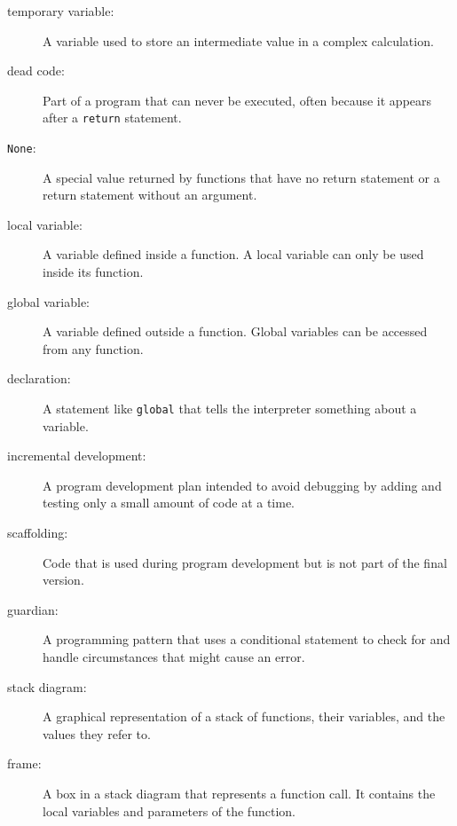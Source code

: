 \begin{description}

\item[temporary variable:]  A variable used to store an intermediate value in
a complex calculation.

\item[dead code:]  Part of a program that can never be executed, often because
it appears after a {\tt return} statement.

\item[{\tt None}:]  A special value returned by functions that
have no return statement or a return statement without an argument.

\item[local variable:]  A variable defined inside a function.  A local
variable can only be used inside its function.

\item[global variable:]  A variable defined outside a function.  Global
variables can be accessed from any function.

\item[declaration:] A statement like {\tt global} that tells the
interpreter something about a variable.


\item[incremental development:]  A program development plan intended to
avoid debugging by adding and testing only
a small amount of code at a time.

\item[scaffolding:]  Code that is used during program development but is
not part of the final version.

\item[guardian:]  A programming pattern that uses a conditional
statement to check for and handle circumstances that
might cause an error.

\item[stack diagram:]  A graphical representation of a stack of functions,
their variables, and the values they refer to.

\item[frame:]  A box in a stack diagram that represents a function call.
It contains the local variables and parameters of the function.


\end{description}
